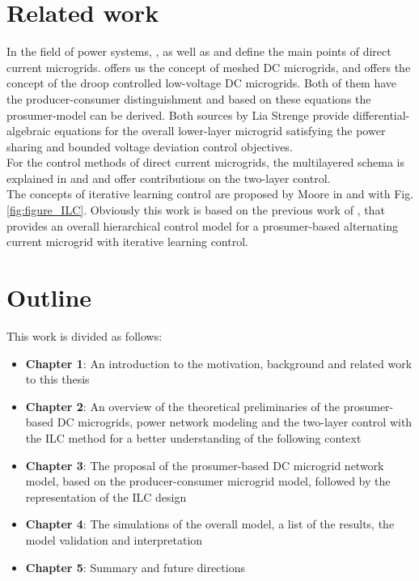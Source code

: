 \section{Related work}
\label{sec:relatedwork}
In the field of power systems, \cite{Hatzi}, as well as \cite{microgrid_concept} and \cite{concept} define the main points of direct current microgrids.  \cite{lia_stability} offers us the concept of meshed DC microgrids, and \cite{lia_master} offers the concept of the droop controlled low-voltage DC microgrids. Both of them have the producer-consumer distinguishment and based on these equations the prosumer-model can be derived. Both sources by Lia Strenge provide differential-algebraic equations for the overall lower-layer microgrid satisfying the power sharing and bounded voltage deviation control objectives.
\\For the control methods of direct current microgrids, the multilayered schema is explained in \cite{controldc} and \cite{hier_control} and \cite{controldc_energy_man} offer contributions on the two-layer control. 
\\The concepts of iterative learning control are proposed by Moore in \cite{moore_ilc} and \cite{vl_ilc} with Fig. \ref{fig:figure_ILC}. Obviously this work is based on the previous work of \cite{paperilc}, that provides an overall hierarchical control model for a prosumer-based alternating current microgrid with iterative learning control.


\section{Outline}
\label{sec:outline}
This work is divided as follows:
\begin{itemize}
\item \textbf{Chapter 1}: An introduction to the motivation, background and related work to this thesis
\item \textbf{Chapter 2}: An overview of the theoretical preliminaries of the prosumer-based DC microgrids, power network modeling and the two-layer control with the ILC method for a better understanding of the following context 
\item \textbf{Chapter 3}: The proposal of the prosumer-based DC microgrid network model, based on the producer-consumer microgrid model, followed by the representation of the ILC design
\item \textbf{Chapter 4}: The simulations of the overall model, a list of the results, the model validation and interpretation
\item \textbf{Chapter 5}: Summary and future directions
\end{itemize}


